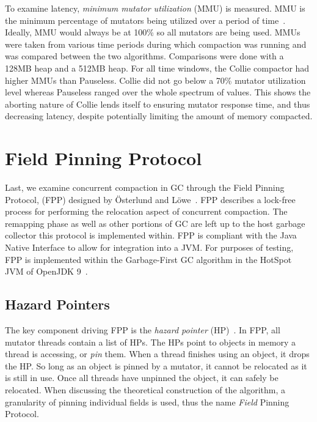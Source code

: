 \documentclass{sig-alternate}
\begin{document}
To examine latency, \emph{minimum mutator utilization} (MMU) is measured.
MMU is the minimum percentage of mutators being utilized over a period of time~\cite{Bacon:MMU}. Ideally,
MMU would always be at 100\% so all mutators are being used. 
MMUs were taken from various time periods during which
compaction was running and was compared between the two algorithms. Comparisons were done
with a 128MB heap and a 512MB heap. For all time windows, the Collie compactor
had higher MMUs than Pauseless. Collie did not go below a 70\% mutator utilization 
level whereas Pauseless ranged over the whole spectrum of values. 
This shows the aborting nature of Collie
lends itself to ensuring mutator response time, and thus decreasing latency, 
despite potentially limiting the amount of memory compacted.


\section{Field Pinning Protocol}
\label{sec:fpp}

Last, we examine concurrent compaction in GC through the Field Pinning
Protocol, (FPP) designed by \"{O}sterlund and L\"{o}we~\cite{Osterlund:FPP}.
FPP describes a lock-free process for performing the relocation aspect
of concurrent compaction. The remapping phase as well as other portions
of GC are left up to the host garbage collector this
protocol is implemented within. FPP is compliant with the Java Native Interface
to allow for integration into a JVM. For purposes of testing, FPP 
is implemented within the Garbage-First GC algorithm in the HotSpot JVM 
of OpenJDK 9~\cite{Detlefs:G1}.


\subsection{Hazard Pointers}
\label{sec:fppHazard}

The key component driving FPP is the \emph{hazard pointer} (HP)~\cite{Osterlund:FPP}. 
In FPP, all mutator threads contain a list of HPs.
The HPs point to objects in memory a thread is accessing, or \emph{pin} them.
When a thread finishes using an object, it drops the HP.
So long as an object
is pinned by a mutator, it cannot be relocated as it is still in use. Once all threads have
unpinned the object, it can safely be relocated.
When discussing the theoretical construction of the algorithm, a granularity of pinning 
individual fields is used, thus the name \emph{Field} Pinning Protocol. 
\end{document}
